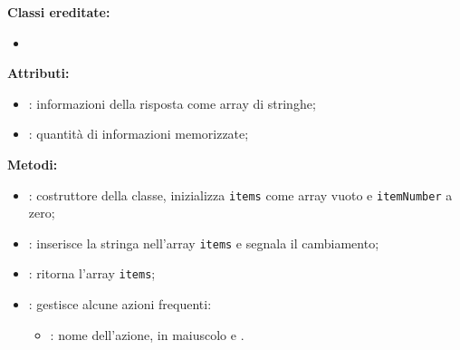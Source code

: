 
\textbf{Classi ereditate:}
\begin{itemize}
	\item {}
\end{itemize}

\textbf{Attributi:}
\begin{itemize}
	\item {}: informazioni della risposta come array di stringhe;
	\item {}: quantità di informazioni memorizzate;
\end{itemize}

\textbf{Metodi:}
\begin{itemize}
	\item {}: costruttore della classe, inizializza \texttt{items} come array vuoto e \texttt{itemNumber} a zero;
	\item {}: inserisce la stringa nell'array \texttt{items} e segnala il cambiamento;
	\item {}: ritorna l'array \texttt{items};
	\item {}: gestisce alcune azioni frequenti:
	\begin{itemize}
		\item {}: nome dell'azione, in maiuscolo e .
	\end{itemize}
\end{itemize}



